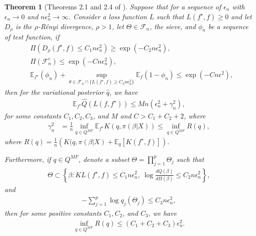 \documentclass[pdftex, noinfoline, letter]{imsart}
\theoremstyle{plain}
\newtheorem{theorem}{Theorem}[section]
\begin{document}
\begin{theorem}[Theorems 2.1 and 2.4 of \citet{zhang20}]
\label{Thm: general-theory-vp}
Suppose that for a sequence of $\epsilon_n$ with $\epsilon_n \to 0$ and $n\epsilon_n^2 \to \infty$.
Consider a loss function $L$ such that $L(f^\star, f) \geq 0$ and let $D_\rho$ is the $\rho$-R\'enyi divergence, $\rho > 1$, let $\Theta \in \mathcal{F}_n$, the sieve, and $\phi_n$ be a sequence of test function, if 
\begin{align}
    & \Pi(D_\rho(f^\star, f) \leq C_1n\epsilon_n^2) \geq \exp(-C_2 n \epsilon_n^2),
    \label{mf-cont-rate-cond1}\\
    & \Pi(\mathcal{F}_n^c) \leq \exp(-Cn\epsilon_n^2), 
    \label{mf-cont-rate-cond2}\\
    & \mathbb{E}_{f^\star}(\phi_n) + \sup_{\theta \in {\mathcal{F}_n \cap \{L(f^\star, f) \geq C_3n\epsilon_n^2\}}} \mathbb{E}_f(1-\phi_n) \leq \exp(-Cn \epsilon^2),
    \label{mf-cont-rate-cond3}
\end{align}
then for the variational posterior $\widehat q$, we have
\begin{align*}
    \mathbb{E}_{f^\star} \widehat Q (L(f, f^\star)) \leq M n(\epsilon_n^2 + \gamma_n^2),
\end{align*}
for some constants $C_1, C_2, C_3$, and $M$ and $C > C_1+C_2+2$,
where 
\begin{align}
\gamma_n^2 & = \frac{1}{n} \inf_{q \in Q^{MF}} \mathbb{E}_{f^\star} K(q, \pi(\beta|X))
\leq \inf_{q \in Q^{MF}} R(q),
\end{align}
where $R(q) = \frac{1}{n}\left(K(q, \pi(\beta|X) + \mathbb{E}_{q}[K(f^\star, f)]\right)$.

Furthermore, if $q \in Q^{MF}$, denote a subset $\Theta = \prod_{j=1}^p \Theta_j$ such that
\begin{align*}
    \Theta \subset 
    \left\{
        \beta: KL(f^\star, f) \leq C_1 n\epsilon_n^2, \
        \log \frac{dQ(\beta)}{d\Pi(\beta)} \leq C_2 n\epsilon_n^2
    \right\}, 
\end{align*}
and 
\begin{align}
\label{mf-cont-rate-cond4}
    - \sum_{j=1}^p \log q_j(\Theta_j) \leq C_3n\epsilon_n^2,
\end{align}
then for some positive constants $C_1, C_2$, and $C_3$, we have 
\begin{align*}
    \inf_{q \in Q^{MF}} R(q)\leq (C_1+C_2+C_3) \epsilon_n^2.
\end{align*}
\end{theorem}




\makeatletter{}\makeatother
\end{document}
